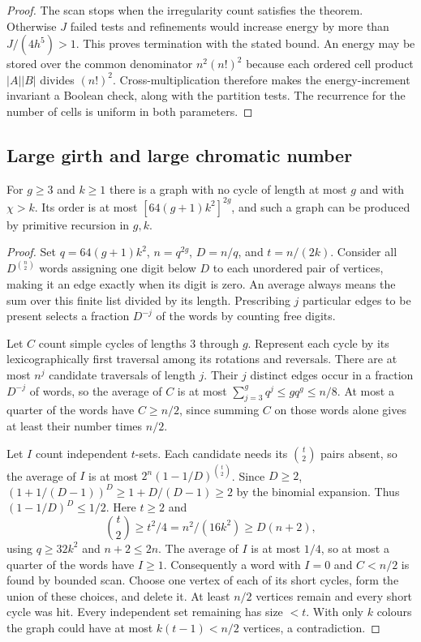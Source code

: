 \begin{proof}
The scan stops when the irregularity count satisfies the theorem.
Otherwise $J$ failed tests and refinements would increase energy by more
than $J/(4h^5)>1$. This proves termination with the stated bound.
An energy may be stored over the common denominator $n^2(n!)^2$ because
each ordered cell product $|A||B|$ divides $(n!)^2$. Cross-multiplication
therefore makes the energy-increment invariant a Boolean check, along with
the partition tests. The recurrence for the number of cells is uniform in
both parameters.
\end{proof}

\subsection{Large girth and large chromatic number}
\begin{theorem}\leavevmode\label{co:girth}
For $g\ge3$ and $k\ge1$ there is a graph with no cycle of length at most
$g$ and with $\chi>k$. Its order is at most
$[64(g+1)k^2]^{2g}$, and such a graph can be produced by primitive
recursion in $g,k$.
\end{theorem}
\begin{proof}
Set $q=64(g+1)k^2$, $n=q^{2g}$, $D=n/q$, and $t=n/(2k)$.
Consider all $D^{\binom n2}$ words assigning one digit below $D$ to each
unordered pair of vertices, making it an edge exactly when its digit is
zero. An average always means the sum over this finite list divided by
its length. Prescribing $j$ particular edges to be present selects a
fraction $D^{-j}$ of the words by counting free digits.

Let $C$ count simple cycles of lengths $3$ through $g$.
Represent each cycle by its lexicographically first traversal among its
rotations and reversals. There are at most $n^j$ candidate traversals of
length $j$. Their $j$ distinct edges occur in a fraction $D^{-j}$ of words,
so the average of $C$ is at most $\sum_{j=3}^g q^j\le gq^g\le n/8$.
At most a quarter of the words have $C\ge n/2$, since summing $C$ on
those words alone gives at least their number times $n/2$.

Let $I$ count independent $t$-sets. Each candidate needs its
$\binom t2$ pairs absent, so the average of $I$ is at most
$2^n(1-1/D)^{\binom t2}$. Since $D\ge2$,
$(1+1/(D-1))^D\ge1+D/(D-1)\ge2$ by the binomial expansion.
Thus $(1-1/D)^D\le1/2$. Here $t\ge2$ and
\[
 \binom t2\ge t^2/4=n^2/(16k^2)\ge D(n+2),
\]
using $q\ge32k^2$ and $n+2\le2n$. The average of $I$ is at most
$1/4$, so at most a quarter of the words have $I\ge1$.
Consequently a word with $I=0$ and $C<n/2$ is found by bounded scan.
Choose one vertex of each of its short cycles, form the union of these
choices, and delete it. At least $n/2$ vertices remain and every short
cycle was hit. Every independent set remaining has size $<t$.
With only $k$ colours the graph could have at most $k(t-1)<n/2$
vertices, a contradiction.
\end{proof}

